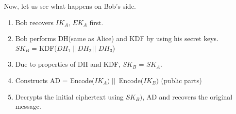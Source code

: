 \documentclass[11pt]{article}
\begin{document}
\begin{enumerate}
\begin{center}

    \end{center}
    
\end{enumerate}

Now, let us see what happens on Bob's side.
\begin{enumerate}
    \item Bob recovers ${IK}_A$, ${EK}_A$ first.
    \item Bob performs DH(same as Alice) and KDF by using his secret keys.\\
     ${SK}_B$ = KDF(${DH}_1 \ || \ {DH}_2 \ || \  {DH}_3$)
    \item Due to properties of DH and KDF, ${SK}_B$ = ${SK}_A$.
    \item Constructs AD = Encode(${IK}_A)\ || \ $ Encode(${IK}_B)$ (public parts)
    \item Decrypts the initial ciphertext using ${SK}_B)$, AD and recovers the original message.
\end{enumerate}
\end{document}
